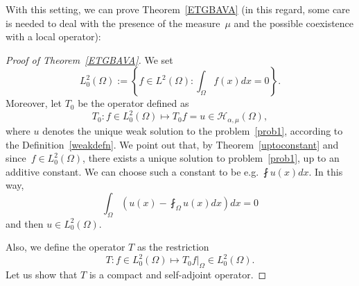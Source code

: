 \documentclass[12pt,a4paper,intlimits,sumlimits]{amsart}
\theoremstyle{definition}
\theoremstyle{plain}
\numberwithin{equation}{section}
\begin{document}
With this setting, we can prove Theorem~\ref{ETGBAVA}
(in this regard, some care is needed to deal with the presence of the measure~$\mu$ and the possible coexistence with a local operator):

\begin{proof}[Proof of Theorem~\ref{ETGBAVA}]
We set
\[
L_0^2(\Omega):=\left\{f\in L^2(\Omega): \int_\Omega f(x) dx =0 \right\}.
\]
Moreover, let $T_0$ be the operator defined as
\begin{equation}\label{T0DEFN}
T_0: f\in L_0^2(\Omega)\longmapsto T_0 f = u\in\mathcal H_{\alpha, \mu}(\Omega),
\end{equation}
where $u$ denotes the unique weak solution to the problem~\eqref{prob1}, according to the Definition~\ref{weakdefn}. We point out that, by Theorem~\ref{uptoconstant} and since~$f\in L_0^2(\Omega)$, there exists a unique solution to problem~\eqref{prob1}, up to an additive constant. We can choose such a constant to be e.g. $\fint u(x) dx$. In this way,
\[
\int_\Omega \left(u(x)-\fint_\Omega u(x) dx\right) dx =0
\]
and then $u\in L_0^2(\Omega)$.

Also, we define the operator $T$ as the restriction
\begin{equation}\label{TRESTRICTION}
T:f\in L_0^2(\Omega)\longmapsto T_0 f \big|_\Omega \in L_0^2(\Omega).
\end{equation}
Let us show that $T$ is a compact and self-adjoint operator.


\end{proof}
\end{document}
